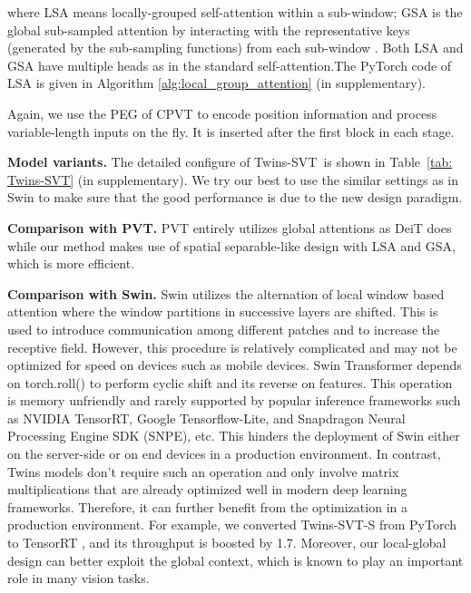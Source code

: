 \documentclass{article}
\def \altour   {Twins-SVT}
\begin{document}
where LSA means locally-grouped self-attention within a sub-window;
GSA is the global   sub-sampled   attention by interacting with the representative keys (generated by the sub-sampling functions) from each sub-window . Both LSA and GSA have multiple heads as in the standard self-attention.The PyTorch code of LSA is given in Algorithm \ref{alg:local_group_attention} (in supplementary).







Again, we use the PEG of CPVT \cite{chu2021ConditionalPE} to encode position information and 
process 
variable-length inputs on the fly. It is inserted after the first block in each stage. 



\noindent\textbf{Model variants.}
The detailed configure of \altour\ is shown in Table~\ref{tab: \altour} (in supplementary). We try our best to use the similar settings as in Swin \cite{liu2021swin} to make sure 
that 
the good  performance  is due to the new design paradigm. 


\noindent\textbf{Comparison with PVT.} PVT entirely utilizes global attentions as DeiT does while our method  makes use of  spatial separable-like design with LSA and GSA, which is more efficient.

\noindent\textbf{Comparison with  Swin.} Swin utilizes the alternation of local window based attention where the window partitions in successive layers are shifted. This is used to introduce communication among different patches and to increase the receptive field. However, this procedure is relatively complicated and may not be optimized for speed on 
devices such as mobile devices. Swin Transformer depends on torch.roll() to perform cyclic shift and its reverse on features. This operation is memory unfriendly and rarely supported by popular inference frameworks such as NVIDIA TensorRT, Google Tensorflow-Lite, and Snapdragon Neural Processing Engine SDK (SNPE), etc. This hinders the deployment of Swin either on the server-side or on end devices in a production environment. In contrast, Twins models don't require such an operation and only involve matrix multiplications that are already optimized well in modern deep learning frameworks. Therefore, it can further benefit from the optimization in a production environment. For example, we converted Twins-SVT-S from PyTorch to TensorRT , and its throughput is boosted by 1.7.  
Moreover, our local-global design 
can better exploit 
the global context, which is known to play an important role in many vision 
tasks.
\end{document}
